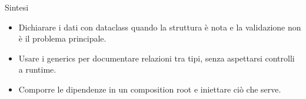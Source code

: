 \documentclass[12pt]{extarticle}
\begin{document}
\begin{cbox}{Sintesi}
\begin{itemize}
    \item Dichiarare i dati con dataclass quando la struttura è nota e la validazione non è il problema principale.
    \item Usare i generics per documentare relazioni tra tipi, senza aspettarsi controlli a runtime.
    \item Comporre le dipendenze in un composition root e iniettare ciò che serve.
\end{itemize}
\end{cbox}
\end{document}
